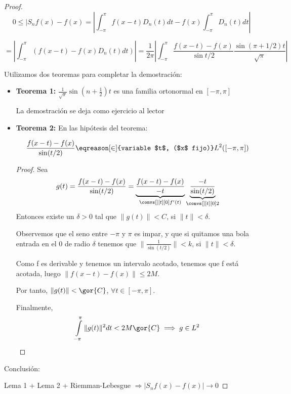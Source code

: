 	\begin{proof}

		\[ 0 \leq |S_nf(x) - f(x)  = \left| \int_{-\pi}^{\pi} f(x-t) D_n(t) dt - f(x) \int_{-\pi}^\pi D_n(t) dt \right|  \]

		\[= \left| \int_{-\pi}^\pi (f(x-t)-f(x) D_n(t) dt) \right| = \frac{1}{2\pi} \left| \int_{-\pi}^\pi \frac{f(x-t)-f(x)}{\sin t/2} \frac{\sin(\pi+1/2)t}{\sqrt{\pi}} \right|  \]

		Utilizamos dos teoremas para completar la demostración:

		\begin{itemize}

			\item \textbf{Teorema 1:} $\frac{1}{\sqrt{\pi}} \sin(n + \frac{1}{2}) t $ es una familia ortonormal en $[-\pi,\pi]$

			La demostración se deja como ejercicio al lector

			\item \textbf{Teorema 2:}  En las hipótesis del teorema:

			\[ \frac{f(x-t)-f(x)}{\sin(t/2)} \eqreason[\in]{variable $t$, ($x$ fijo)} L^2 ([-\pi,\pi]) \]

			\begin{proof}
				Sea
				\[ g(t) = \frac{f(x-t)-f(x)}{\sin(t/2)} = \underbrace{\frac{f(x-t)-f(x)}{-t}}_{\convs[ ][t][0] f'(t)} \underbrace{\frac{-t}{\sin(t/2)}}_{\convs[ ][t][0] 2} \]
				Entonces existe un $\delta > 0$ tal que $\| g(t) \| < C$, si $\| t \| < \delta$.

				Observemos que el seno entre $-\pi$ y $\pi$ es impar, y que si quitamos una bola entrada en el 0 de radio $\delta$ tenemos que $\| \frac{1}{\sin(t/2)} \| < k$, si $\| t \| < \delta$.

				Como f es derivable y tenemos un intervalo acotado, tenemos que f está acotada, luego $\| f(x-t) - f(x) \| \leq 2 M$.

				Por tanto, $\| g(t) \| < \gor{C}$, $\forall t \in [-\pi,\pi]$.

				Finalmente,
				\[ \int\limits_{-\pi}^{\pi} \| g(t) \|^2 dt < 2M \gor{C} \implies g \in L^2 \]
			\end{proof}

		\end{itemize}

		Conclusión:

		Lema 1 + Lema 2 + Riemman-Lebesgue $\Rightarrow \left| S_n f(x) - f(x) \right| \rightarrow 0$

	\end{proof}

